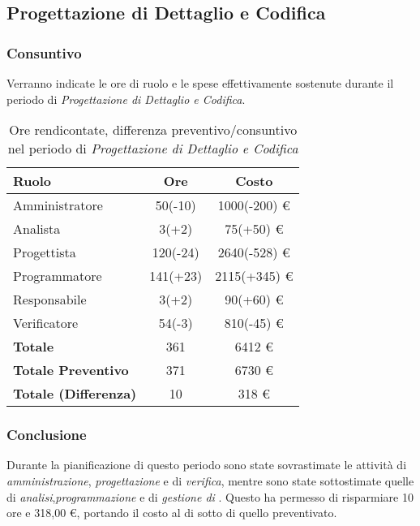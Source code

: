 \subsection{Progettazione di Dettaglio e Codifica}
\subsubsection{Consuntivo}
Verranno indicate le ore di ruolo e le spese effettivamente sostenute durante il periodo di \textit{Progettazione di Dettaglio e Codifica}.

\begin{table}[H]
	\centering
	\begin{tabular}{ l c c }
		\textbf{Ruolo} & \textbf{Ore} & \textbf{Costo} \\
		\hline
		Amministratore & 50(-10) & 1000(-200) \euro{} \\
		Analista & 3(+2) & 75(+50) \euro{} \\
		Progettista & 120(-24) & 2640(-528) \euro{} \\ %
		Programmatore & 141(+23) & 2115(+345) \euro{} \\ %
		Responsabile & 3(+2) & 90(+60) \euro{} \\
		Verificatore & 54(-3) & 810(-45) \euro{} \\
		\hline
		\textbf{Totale \glossaryItem{Consuntivo}} & 361 & 6412 \euro{} \\
		\hline
		\textbf{Totale Preventivo} & 371 & 6730 \euro{} \\
		\hline
		\textbf{Totale (Differenza)} & 10 & 318 \euro{} \\
		\hline
	\end{tabular}
	\caption{Ore rendicontate, differenza preventivo/consuntivo nel periodo di \textit{Progettazione di Dettaglio e Codifica}}
\end{table}



\subsubsection{Conclusione}
Durante la pianificazione di questo periodo sono state sovrastimate le attivit\`a di \textit{amministrazione}, \textit{progettazione} e di \textit{verifica}, mentre sono state sottostimate quelle di \textit{analisi},\textit{programmazione} e di \textit{gestione di }.
Questo ha permesso di risparmiare 10 ore e 318,00 \euro{}, portando il costo  al di sotto di quello preventivato.
